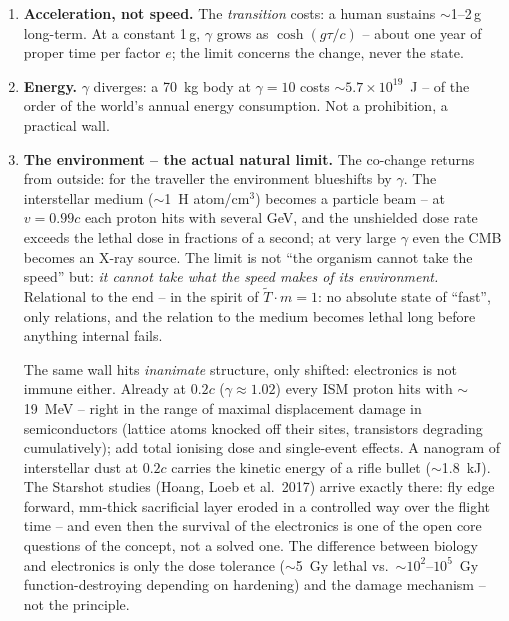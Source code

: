 \documentclass[11pt]{report}
\begin{document}
\begin{enumerate}
  \item \textbf{Acceleration, not speed.} The \emph{transition}
        costs: a human sustains $\sim$1--2\,g long-term. At a
        constant 1\,g, $\gamma$ grows as $\cosh(g\tau/c)$ -- about
        one year of proper time per factor $e$; the limit concerns
        the change, never the state.
  \item \textbf{Energy.} $\gamma$ diverges: a 70~kg body at
        $\gamma = 10$ costs $\sim 5.7\times10^{19}$~J -- of the
        order of the world's annual energy consumption. Not a
        prohibition, a practical wall.
  \item \textbf{The environment -- the actual natural limit.} The
        co-change returns from outside: for the traveller the
        environment blueshifts by $\gamma$. The interstellar
        medium ($\sim$1~H atom/cm$^3$) becomes a particle beam --
        at $v = 0.99c$ each proton hits with several GeV, and the
        unshielded dose rate exceeds the lethal dose in fractions
        of a second; at very large $\gamma$ even the CMB becomes an
        X-ray source. The limit is not \enquote{the organism cannot
        take the speed} but: \emph{it cannot take what the speed
        makes of its environment.} Relational to the end -- in the
        spirit of $\tilde T \cdot m = 1$: no absolute state of
        \enquote{fast}, only relations, and the relation to the
        medium becomes lethal long before anything internal fails.

        The same wall hits \emph{inanimate} structure, only
        shifted: electronics is not immune either. Already at
        $0.2c$ ($\gamma \approx 1.02$) every ISM proton hits with
        $\sim$19~MeV -- right in the range of maximal displacement
        damage in semiconductors (lattice atoms knocked off their
        sites, transistors degrading cumulatively); add total
        ionising dose and single-event effects. A nanogram of
        interstellar dust at $0.2c$ carries the kinetic energy of
        a rifle bullet ($\sim$1.8~kJ). The Starshot studies
        (Hoang, Loeb et al.\ 2017) arrive exactly there: fly edge
        forward, mm-thick sacrificial layer eroded in a controlled
        way over the flight time -- and even then the survival of
        the electronics is one of the open core questions of the
        concept, not a solved one. The difference between biology
        and electronics is only the dose tolerance ($\sim$5~Gy
        lethal vs.\ $\sim$$10^2$--$10^5$~Gy function-destroying
        depending on hardening) and the damage mechanism -- not
        the principle.
\end{enumerate}
\end{document}
